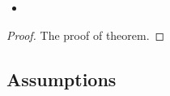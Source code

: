 \documentclass{mcmthesis}
\begin{document}
\begin{itemize}

\item 
\end{itemize}







\begin{Theorem} \label{thm:latex}

\end{Theorem}

\begin{Lemma} \label{thm:tex}

\end{Lemma}

\begin{proof}
The proof of theorem.
\end{proof}

\subsection{Assumptions}
\end{document}
